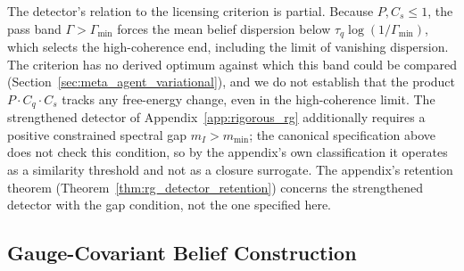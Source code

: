 \documentclass[11pt]{article}
\begin{document}
The detector's relation to the licensing criterion is partial. Because $P, C_s \le 1$, the pass band $\Gamma > \Gamma_{\min}$ forces the mean belief dispersion below $\tau_q\log(1/\Gamma_{\min})$, which selects the high-coherence end, including the limit of vanishing dispersion. The criterion has no derived optimum against which this band could be compared (Section~\ref{sec:meta_agent_variational}), and we do not establish that the product $P \cdot C_q \cdot C_s$ tracks any free-energy change, even in the high-coherence limit. The strengthened detector of Appendix~\ref{app:rigorous_rg} additionally requires a positive constrained spectral gap $m_I > m_{\min}$; the canonical specification above does not check this condition, so by the appendix's own classification it operates as a similarity threshold and not as a closure surrogate. The appendix's retention theorem (Theorem~\ref{thm:rg_detector_retention}) concerns the strengthened detector with the gap condition, not the one specified here.

\subsection{Gauge-Covariant Belief Construction}
\label{sec:meta_agent_state_construction}
\end{document}
